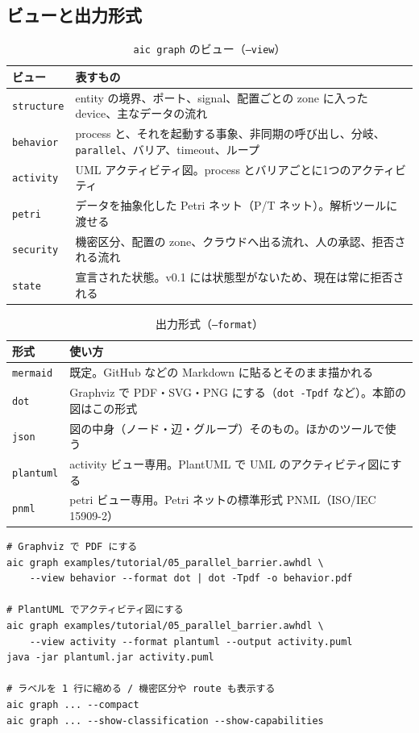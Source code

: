 \documentclass[a4paper,11pt]{ltjsarticle}
\begin{document}
\subsection{ビューと出力形式}

\begin{table}[h]
\centering
\caption{\texttt{aic graph} のビュー（\texttt{--view}）}
\begin{tabularx}{\linewidth}{lX}
\toprule
ビュー & 表すもの \\
\midrule
\texttt{structure} & entity の境界、ポート、signal、配置ごとの zone に入った device、主なデータの流れ \\
\texttt{behavior} & process と、それを起動する事象、非同期の呼び出し、分岐、\texttt{parallel}、バリア、timeout、ループ \\
\texttt{activity} & UML アクティビティ図。process とバリアごとに1つのアクティビティ \\
\texttt{petri} & データを抽象化した Petri ネット（P/T ネット）。解析ツールに渡せる \\
\texttt{security} & 機密区分、配置の zone、クラウドへ出る流れ、人の承認、拒否される流れ \\
\texttt{state} & 宣言された状態。v0.1 には状態型がないため、現在は常に拒否される \\
\bottomrule
\end{tabularx}
\end{table}

\begin{table}[h]
\centering
\caption{出力形式（\texttt{--format}）}
\begin{tabularx}{\linewidth}{lX}
\toprule
形式 & 使い方 \\
\midrule
\texttt{mermaid} & 既定。GitHub などの Markdown に貼るとそのまま描かれる \\
\texttt{dot} & Graphviz で PDF・SVG・PNG にする（\texttt{dot -Tpdf} など）。本節の図はこの形式 \\
\texttt{json} & 図の中身（ノード・辺・グループ）そのもの。ほかのツールで使う \\
\texttt{plantuml} & activity ビュー専用。PlantUML で UML のアクティビティ図にする \\
\texttt{pnml} & petri ビュー専用。Petri ネットの標準形式 PNML（ISO/IEC 15909-2） \\
\bottomrule
\end{tabularx}
\end{table}

\begin{lstlisting}[style=shell]
# Graphviz で PDF にする
aic graph examples/tutorial/05_parallel_barrier.awhdl \
    --view behavior --format dot | dot -Tpdf -o behavior.pdf

# PlantUML でアクティビティ図にする
aic graph examples/tutorial/05_parallel_barrier.awhdl \
    --view activity --format plantuml --output activity.puml
java -jar plantuml.jar activity.puml

# ラベルを 1 行に縮める / 機密区分や route も表示する
aic graph ... --compact
aic graph ... --show-classification --show-capabilities
\end{lstlisting}
\end{document}
